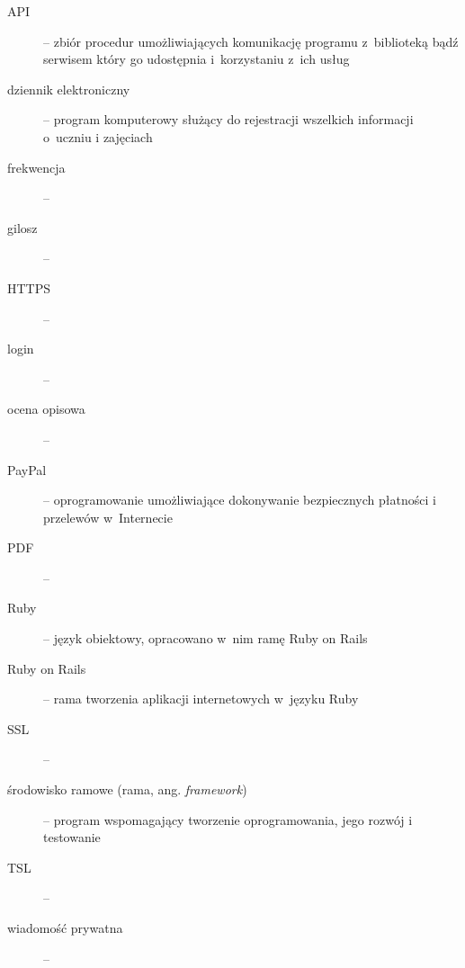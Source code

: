 \documentclass[12pt,leqno,twoside]{mwart}
\begin{document}
\begin{description}
\item[API]-- zbiór procedur umożliwiających komunikację programu z~biblioteką bądź serwisem który go udostępnia i~korzystaniu z~ich usług\\
\item[dziennik elektroniczny]-- program komputerowy służący do rejestracji wszelkich informacji o~uczniu i zajęciach\\
\item[frekwencja]-- \\
\item[gilosz]-- \\
\item[HTTPS]-- \\
\item[login]-- \\
\item[ocena opisowa]-- \\
\item[PayPal]-- oprogramowanie umożliwiające dokonywanie bezpiecznych płatności i przelewów w~Internecie\\
\item[PDF]-- \\
\item[Ruby]-- język obiektowy, opracowano w~nim ramę Ruby on Rails\\
\item[Ruby on Rails]-- rama tworzenia aplikacji internetowych w~języku Ruby\\
\item[SSL]-- \\
\item[środowisko ramowe (rama, ang. \textit{framework})]-- program wspomagający tworzenie oprogramowania, jego rozwój i testowanie\\
\item[TSL]-- \\
\item[wiadomość prywatna]-- \\
\end{description}
\end{document}
